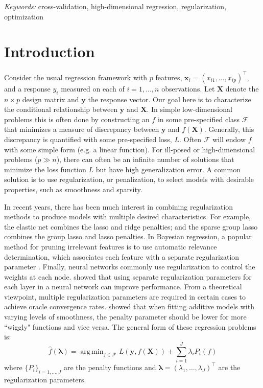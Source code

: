 \documentclass[12pt]{article}
\DeclareMathOperator*{\argmin}{arg\,min}
\begin{document}
\noindent%
{\it Keywords:}  cross-validation, high-dimensional regression, regularization, optimization
\vfill

\newpage
{}
\section{Introduction}
Consider the usual regression framework with $p$ features, $\boldsymbol x_i = (x_{i1},\ldots,x_{ip})^\top$, and a response $y_i$ measured on each of $i=1,\ldots,n$ observations. Let $\boldsymbol X$ denote the $n \times p$ design matrix and $\boldsymbol y$ the response vector. Our goal here is to characterize the conditional relationship between $\boldsymbol y$ and $\boldsymbol X$. In simple low-dimensional problems this is often done by constructing an $f$ in some pre-specified class $\mathcal{F}$ that minimizes a measure of discrepancy between $\boldsymbol y$ and $f(\boldsymbol X)$. Generally, this discrepancy is quantified with some pre-specified loss, $L$. Often $\mathcal{F}$ will endow $f$ with some simple form (e.g. a linear function). For ill-posed or high-dimensional problems ($p \gg n$), there can often be an infinite number of solutions that minimize the loss function $L$ but have high generalization error. A common solution is to use regularization, or penalization, to select models with desirable properties, such as smoothness and sparsity.

In recent years, there has been much interest in combining regularization methods to produce models with multiple desired characteristics. For example, the elastic net \citep{zou2003regression} combines the lasso and ridge penalties; and the sparse group lasso \citep{simon2013sparse} combines the group lasso and lasso penalties. In Bayesian regression, a popular method for pruning irrelevant features is to use automatic relevance determination, which associates each feature with a separate regularization parameter \citep{neal1996bayesian}. Finally, neural networks commonly use regularization to control the weights at each node. \citet{snoek2012practical} showed that using separate regularization parameters for each layer in a neural network can improve performance. From a theoretical viewpoint, multiple regularization parameters are required in certain cases to achieve oracle convergence rates. \citet{van2014additive} showed that when fitting additive models with varying levels of smoothness, the penalty parameter should be lower for more ``wiggly" functions and vice versa. The general form of these regression problems is:
\begin{equation} \label {eq:basic}
\hat f(\boldsymbol{\lambda}) = \argmin_{f\in\mathcal{F}} L\left (\boldsymbol{y}, f (\boldsymbol{X}) \right ) + \sum\limits_{i=1}^J \lambda_i P_i(f)
\end{equation}
where $\{P_i\}_{i=1, ..., J}$ are the penalty functions and $\boldsymbol{\lambda} = (\lambda_1, \ldots, \lambda_J)^\top$ are the regularization parameters. 
\end{document}
